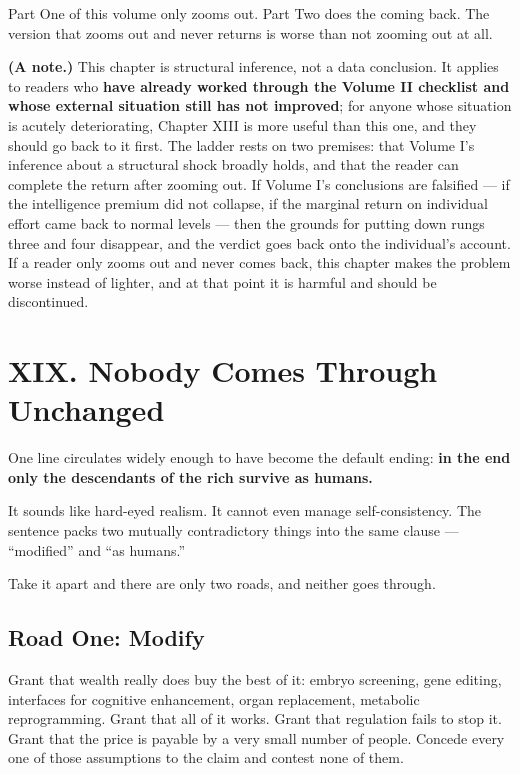 \documentclass[11pt,a4paper]{article}
\begin{document}
Part One of this volume only zooms out. Part Two does the coming back. The version that zooms out and never returns is worse than not zooming out at all.

\textbf{(A note.)} This chapter is structural inference, not a data conclusion. It applies to readers who \textbf{have already worked through the Volume II checklist and whose external situation still has not improved}; for anyone whose situation is acutely deteriorating, Chapter XIII is more useful than this one, and they should go back to it first. The ladder rests on two premises: that Volume I's inference about a structural shock broadly holds, and that the reader can complete the return after zooming out. If Volume I's conclusions are falsified --- if the intelligence premium did not collapse, if the marginal return on individual effort came back to normal levels --- then the grounds for putting down rungs three and four disappear, and the verdict goes back onto the individual's account. If a reader only zooms out and never comes back, this chapter makes the problem worse instead of lighter, and at that point it is harmful and should be discontinued.

\section{XIX. Nobody Comes Through Unchanged}

One line circulates widely enough to have become the default ending: \textbf{in the end only the descendants of the rich survive as humans.}

It sounds like hard-eyed realism. It cannot even manage self-consistency. The sentence packs two mutually contradictory things into the same clause --- ``modified'' and ``as humans.''

Take it apart and there are only two roads, and neither goes through.

\subsection{Road One: Modify}

Grant that wealth really does buy the best of it: embryo screening, gene editing, interfaces for cognitive enhancement, organ replacement, metabolic reprogramming. Grant that all of it works. Grant that regulation fails to stop it. Grant that the price is payable by a very small number of people. Concede every one of those assumptions to the claim and contest none of them.
\end{document}

